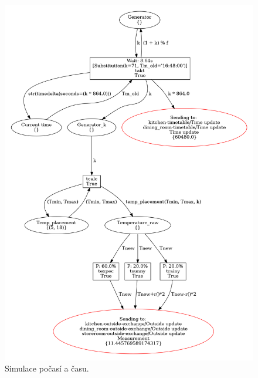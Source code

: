 \begin{figure}[htb]
  \centering
  \includegraphics[width=\textwidth]{obrazky-figures/weather-sim.png}
  \caption{Simulace počasí a času.}
  \label{weather-viz}
\end{figure}

